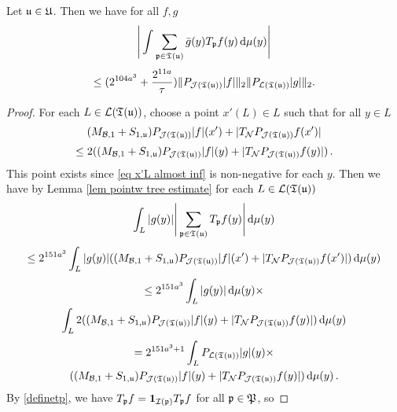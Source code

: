 
\begin{lemma}
    \label{TreeEstimate}
    Let $\mathfrak u \in \mathfrak U$.
    Then we have for all $f, g$
    $$
        \Bigg|\int \sum_{\mathfrak p \in \mathfrak T(\mathfrak u)} \bar g(y) T_{\mathfrak p}f(y) \, \mathrm{d}\mu(y)  \Bigg|
    $$
    \begin{equation}
        \label{eq tree est}
            \le (2^{104a^3} + \frac{2^{11a}}{\tau}) \|P_{\mathcal{J}(\mathfrak T(\mathfrak u))}|f|\|_{2}\|P_{\mathcal{L}(\mathfrak T(\mathfrak u))}|g|\|_{2}.
    \end{equation}
\end{lemma}

\begin{proof}
    For each $L \in \mathcal{L}(\mathfrak T(\mathfrak u))$, choose a point $x'(L) \in L$ such that for all $y \in L$
    $$
        (M_{\mathcal{B},1}+S_{1,\mathfrak u})P_{\mathcal{J}(\mathfrak T(\mathfrak u))}|f|(x')+|T_{\mathcal{N}}P_{\mathcal{J}(\mathfrak T(\mathfrak u))}f(x')|
    $$
    \begin{equation}
        \label{eq x'L almost inf}
        \le 2 ((M_{\mathcal{B},1}+S_{1,\mathfrak u})P_{\mathcal{J}(\mathfrak T(\mathfrak u))}|f|(y)+|T_{\mathcal{N}}P_{\mathcal{J}(\mathfrak T(\mathfrak u))}f(y)|)\,.
    \end{equation}
    This point exists since \eqref{eq x'L almost inf} is non-negative for each $y$.
    Then we have by Lemma \ref{lem pointw tree estimate} for each $L \in \mathcal{L}(\mathfrak T(\mathfrak u))$
    $$
        \int_L |g(y)| \Bigg| \sum_{\mathfrak p \in \mathfrak T(\mathfrak u)} T_{\mathfrak p} f(y) \Bigg| \, \mathrm{d}\mu(y)
    $$
    $$
        \le 2^{151a^3} \int_L |g(y)| ((M_{\mathcal{B},1}+S_{1,\mathfrak u})P_{\mathcal{J}(\mathfrak T(\mathfrak u))}|f|(x')+|T_{\mathcal{N}}P_{\mathcal{J}(\mathfrak T(\mathfrak u))}f(x')| ) \, \mathrm{d}\mu(y)
    $$
    \begin{multline*}
        \le 2^{151a^3} \int_L |g(y)| \, \mathrm{d}\mu(y)\times\\
            \int_L 2((M_{\mathcal{B},1}+S_{1,\mathfrak u})P_{\mathcal{J}(\mathfrak T(\mathfrak u))}|f|(y)+|T_{\mathcal{N}}P_{\mathcal{J}(\mathfrak T(\mathfrak u))}f(y)| ) \, \mathrm{d}\mu(y)
    \end{multline*}
    \begin{multline*}
        =  2^{151a^3 + 1} \int_L P_{\mathcal{L}(\mathfrak T(\mathfrak u))}|g|(y)\times \\((M_{\mathcal{B},1}+S_{1,\mathfrak u})P_{\mathcal{J}(\mathfrak T(\mathfrak u))}|f|(y)+|T_{\mathcal{N}}P_{\mathcal{J}(\mathfrak T(\mathfrak u))}f(y)| ) \, \mathrm{d}\mu(y)\,.
    \end{multline*}
    By \eqref{definetp}, we have $T_{\mathfrak p} f = \mathbf{1}_{\mathcal{I}(\mathfrak p)} T_{\mathfrak p} f$ for all $\mathfrak p \in \mathfrak P$, so

\end{proof}
